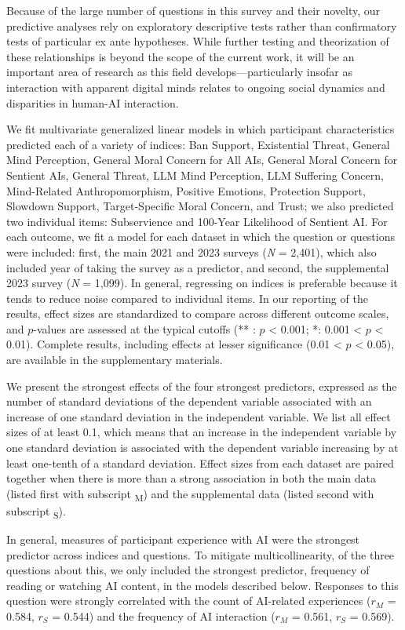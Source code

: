 \documentclass[manuscript,screen,review,nonacm]{acmart}
\begin{document}
Because of the large number of questions in this survey and their novelty, our predictive analyses rely on exploratory descriptive tests rather than confirmatory tests of particular ex ante hypotheses. While further testing and theorization of these relationships is beyond the scope of the current work, it will be an important area of research as this field develops—particularly insofar as interaction with apparent digital minds relates to ongoing social dynamics and disparities in human-AI interaction.

We fit multivariate generalized linear models in which participant characteristics predicted each of a variety of indices: Ban Support, Existential Threat, General Mind Perception, General Moral Concern for All AIs, General Moral Concern for Sentient AIs, General Threat, LLM Mind Perception, LLM Suffering Concern, Mind-Related Anthropomorphism, Positive Emotions, Protection Support, Slowdown Support, Target-Specific Moral Concern, and Trust; we also predicted two individual items: Subservience and 100-Year Likelihood of Sentient AI. For each outcome, we fit a model for each dataset in which the question or questions were included: first, the main 2021 and 2023 surveys (\textit{N} = 2,401), which also included year of taking the survey as a predictor, and second, the supplemental 2023 survey (\textit{N} = 1,099). In general, regressing on indices is preferable because it tends to reduce noise compared to individual items. In our reporting of the results, effect sizes are standardized to compare across different outcome scales, and $p$-values are assessed at the typical cutoffs (** : $p$ < 0.001; *: 0.001 < $p$ < 0.01). Complete results, including effects at lesser significance (0.01 < $p$ < 0.05), are available in the supplementary materials.

We present the strongest effects of the four strongest predictors, expressed as the number of standard deviations of the dependent variable associated with an increase of one standard deviation in the independent variable. We list all effect sizes of at least 0.1, which means that an increase in the independent variable by one standard deviation is associated with the dependent variable increasing by at least one-tenth of a standard deviation. Effect sizes from each dataset are paired together when there is more than a strong association in both the main data (listed first with subscript \textsubscript{M}) and the supplemental data (listed second with subscript \textsubscript{S}).

In general, measures of participant experience with AI were the strongest predictor across indices and questions. To mitigate multicollinearity, of the three questions about this, we only included the strongest predictor, frequency of reading or watching AI content, in the models described below. Responses to this question were strongly correlated with the count of AI-related experiences ($r_M$ = 0.584, $r_S$ = 0.544) and the frequency of AI interaction ($r_M$ = 0.561, $r_S$ = 0.569).
\end{document}
